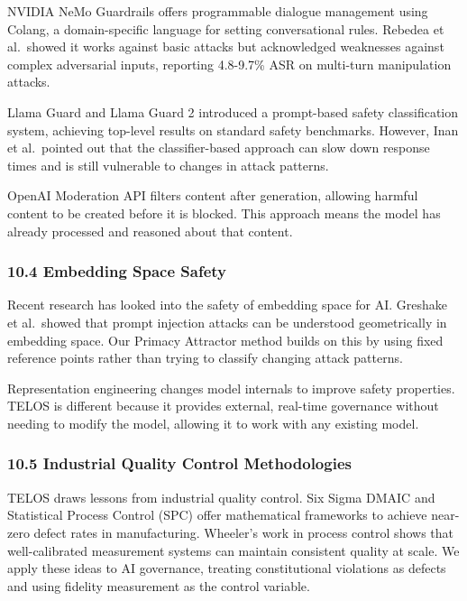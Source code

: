 NVIDIA NeMo Guardrails offers programmable dialogue management using
Colang, a domain-specific language for setting conversational rules.
Rebedea et al.~showed it works against basic attacks but acknowledged
weaknesses against complex adversarial inputs, reporting 4.8-9.7\% ASR
on multi-turn manipulation attacks.

Llama Guard and Llama Guard 2 introduced a prompt-based safety
classification system, achieving top-level results on standard safety
benchmarks. However, Inan et al.~pointed out that the classifier-based
approach can slow down response times and is still vulnerable to changes
in attack patterns.

OpenAI Moderation API filters content after generation, allowing harmful
content to be created before it is blocked. This approach means the
model has already processed and reasoned about that content.

\subsubsection{10.4 Embedding Space
Safety}\label{embedding-space-safety}

Recent research has looked into the safety of embedding space for AI.
Greshake et al.~showed that prompt injection attacks can be understood
geometrically in embedding space. Our Primacy Attractor method builds on
this by using fixed reference points rather than trying to classify
changing attack patterns.

Representation engineering changes model internals to improve safety
properties. TELOS is different because it provides external, real-time
governance without needing to modify the model, allowing it to work with
any existing model.

\subsubsection{10.5 Industrial Quality Control
Methodologies}\label{industrial-quality-control-methodologies}

TELOS draws lessons from industrial quality control. Six Sigma DMAIC and
Statistical Process Control (SPC) offer mathematical frameworks to
achieve near-zero defect rates in manufacturing. Wheeler's work in
process control shows that well-calibrated measurement systems can
maintain consistent quality at scale. We apply these ideas to AI
governance, treating constitutional violations as defects and using
fidelity measurement as the control variable.

